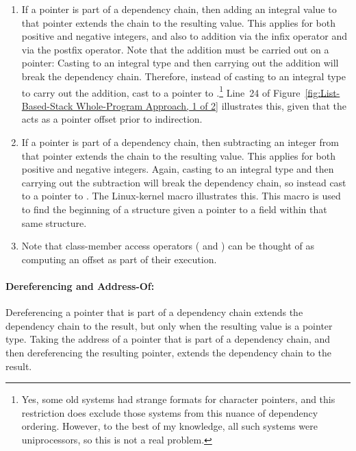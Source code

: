 \documentclass[letterpaper,twocolumn,10pt]{article}
\begin{document}
\begin{enumerate}
\item	If a pointer is part of a dependency chain, then adding an integral
	value to that pointer extends the chain to the resulting value.
	This applies for both positive and negative integers, and also
	to addition via the infix \co{+} operator and via the postfix
	\co{[]} operator.
	Note that the addition must be carried out on a pointer:
	Casting to an integral type and then carrying out the addition
	will break the dependency chain.
	Therefore, instead of casting to an integral type to carry
	out the addition, cast to a pointer to .\footnote{
		Yes, some old systems had strange formats for character
		pointers, and this restriction does exclude those systems
		from this nuance of dependency ordering.
		However, to the best of my knowledge, all such
		systems were uniprocessors, so this is not a real problem.}
	Line~24 of
	Figure~\ref{fig:List-Based-Stack Whole-Program Approach, 1 of 2}
	illustrates this, given that the  acts as a pointer offset
	prior to indirection.
\item	If a pointer is part of a dependency chain, then subtracting an integer
	from that pointer extends the chain to the resulting value.
	This applies for both positive and negative integers.
	Again, casting to an integral type and then carrying out the
	subtraction will break the dependency chain, so instead cast to
	a pointer to .
	The Linux-kernel  macro illustrates this.
	This macro is used to find the beginning of a structure given
	a pointer to a field within that same structure.
\item	Note that class-member access operators ( and \co{->})
	can be thought of as computing an offset as part of their
	execution.
\end{enumerate}

\paragraph{Dereferencing and Address-Of:}

Dereferencing a pointer that is part of a dependency chain extends the
dependency chain to the result, but only when the resulting value is a
pointer type.
Taking the address of a pointer that is part of a dependency chain,
and then dereferencing the resulting pointer, extends the dependency
chain to the result.
\end{document}
